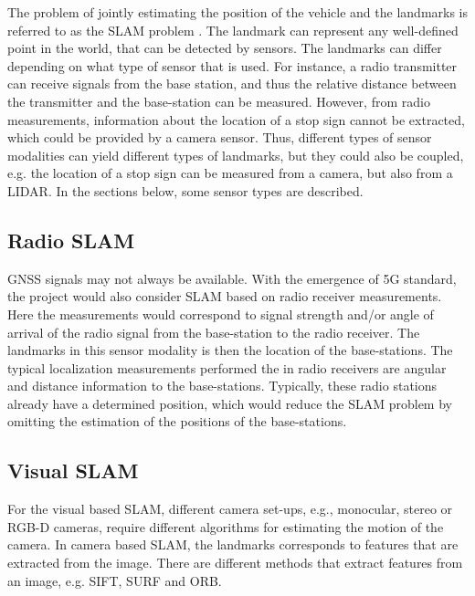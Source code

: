 The problem of jointly estimating the position of the vehicle and the landmarks
is referred to as the \gls{SLAM} problem
\cite{DBLP:journals/corr/CadenaCCLSN0L16}. The landmark can represent any
well-defined point in the world, that can be detected by sensors. The landmarks
can differ depending on what type of sensor that is used. For instance, a radio
transmitter can receive signals from the base station, and thus the relative
distance between the transmitter and the base-station can be measured. However,
from radio measurements, information about the location of a stop sign cannot
be extracted, which could be provided by a camera sensor. Thus, different types
of sensor modalities can yield different types of landmarks, but they could
also be coupled, e.g. the location of a stop sign can be measured from a
camera, but also from a \gls{LIDAR}. In the sections below, some
sensor types are described.

\subsection{Radio SLAM}

\gls{GNSS} signals may not always be available. With the emergence of 5G
standard, the project would also consider \gls{SLAM} based on radio receiver
measurements. Here the measurements would correspond to signal strength and/or
angle of arrival of the radio signal from the base-station to the radio
receiver. The landmarks in this sensor modality is then the location of the
base-stations. The typical localization measurements performed the in radio receivers
are angular and distance information to the base-stations. Typically,
these radio stations already have a determined position, which would
reduce the \gls{SLAM} problem by omitting the estimation of the
positions of the base-stations.

\subsection{Visual SLAM}

For the visual based \gls{SLAM}, different camera set-ups, e.g., monocular,
stereo or RGB-D
cameras, require different algorithms for estimating the motion of
the camera. In camera based \gls{SLAM}, the landmarks corresponds to features
that are extracted from the image. There are different methods that extract
features from an image, e.g. \gls{SIFT}\cite{Lowe:1999:ORL:850924.851523},
\gls{SURF}\cite{Bay:2008:SRF:1370312.1370556} and
\gls{ORB}\cite{Rublee:2011:OEA:2355573.2356268}.

